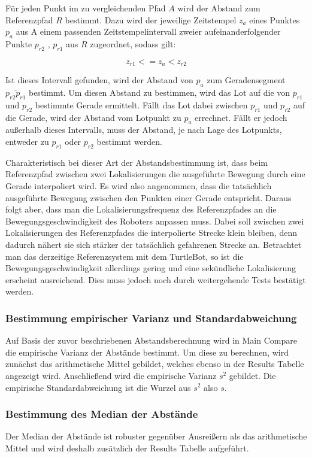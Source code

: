 Für jeden Punkt im zu vergleichenden Pfad $A$
wird der Abstand zum Referenzpfad $R$ bestimmt. Dazu wird der jeweilige
Zeitstempel $z_a$ eines Punktes $p_a$ aus A einem passenden
Zeitstempelintervall zweier aufeinanderfolgender Punkte $p_{r2}$ , $p_{r1}$ aus $R$ zugeordnet, sodass
gilt:

\[
z_{r1} <= z_a < z_{r2}
\]

Ist dieses Intervall gefunden, wird der Abstand von $p_a$ zum Geradensegment
$\overline{p_{r2} p_{r1}}$ bestimmt. Um diesen Abstand zu bestimmen, wird das
Lot auf die von $p_{r1}$ und $p_{r2}$ bestimmte Gerade ermittelt. Fällt das Lot
dabei zwischen $p_{r1}$ und $p_{r2}$ auf die Gerade, wird der Abstand vom
Lotpunkt zu $p_a$ errechnet. Fällt er jedoch außerhalb dieses Intervalls, muss
der Abstand, je nach Lage des Lotpunkts, entweder zu $p_{r1}$ oder $p_{r2}$
bestimmt werden. 

Charakteristisch bei dieser Art der Abstandsbestimmung ist, dass beim
Referenzpfad zwischen zwei Lokalisierungen die ausgeführte Bewegung durch eine
Gerade interpoliert wird. 
Es wird also angenommen, dass die tatsächlich
ausgeführte Bewegung zwischen den Punkten einer Gerade entspricht. Daraus
folgt aber, dass man die Lokalisierungsfrequenz des Referenzpfades an die
Bewegungsgeschwindigkeit des Roboters anpassen muss. Dabei soll
zwischen zwei Lokalisierungen des Referenzpfades die interpolierte Strecke
klein bleiben, denn dadurch nähert sie sich stärker der tatsächlich gefahrenen
Strecke an. Betrachtet man das derzeitige Referenzsystem mit dem TurtleBot, so
ist die Bewegungsgeschwindigkeit allerdings gering und eine sekündliche
Lokalisierung erscheint ausreichend. Dies muss jedoch noch durch weitergehende
Tests bestätigt werden.


\subsubsection{Bestimmung empirischer Varianz und Standardabweichung}
Auf Basis der zuvor beschriebenen Abstandsberechnung wird in Main Compare die
empirische Varianz der Abstände bestimmt. Um diese zu berechnen, wird zunächst
das arithmetische Mittel gebildet, welches ebenso in der Results Tabelle angezeigt wird.
Anschließend wird die empirische Varianz $s^2$ gebildet. Die empirische Standardabweichung
ist die Wurzel aus $s^2$ also $s$.

\subsubsection{Bestimmung des Median der Abstände}
Der Median der Abstände ist robuster gegenüber Ausreißern als das
arithmetische Mittel und wird deshalb zusätzlich der Results Tabelle
aufgeführt.


